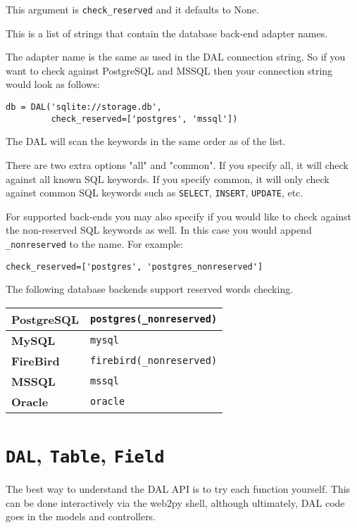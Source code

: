 \documentclass[justified,sixbynine,notoc]{tufte-book}
\def\ft{\small\tt}
\begin{document}
\begin{fullwidth}
This argument is {\ft check\_reserved} and it defaults to None.

This is a list of strings that contain the database back-end adapter names.

The adapter name is the same as used in the DAL connection string. So if you want to check against PostgreSQL and MSSQL then your connection string would look as follows:
\begin{lstlisting}
db = DAL('sqlite://storage.db',
         check_reserved=['postgres', 'mssql'])
\end{lstlisting}

The DAL will scan the keywords in the same order as of the list.

There are two extra options "all" and "common". If you specify all, it will check against all known SQL keywords. If you specify common, it will only check against common SQL keywords such as {\ft SELECT}, {\ft INSERT}, {\ft UPDATE}, etc.

For supported back-ends you may also specify if you would like to check against the non-reserved SQL keywords as well. In this case you would append {\ft \_nonreserved} to the name. For example:
\begin{lstlisting}
check_reserved=['postgres', 'postgres_nonreserved']
\end{lstlisting}

The following database backends support reserved words checking.

\goodbreak\begin{center}
{\begin{tabular}{ll}\hline
{\bf PostgreSQL} & {\ft postgres(\_nonreserved)}\\ \hline
{\bf MySQL} & {\ft mysql}\\
{\bf FireBird} & {\ft firebird(\_nonreserved)}\\
{\bf MSSQL} & {\ft mssql}\\
{\bf Oracle} & {\ft oracle} \\ \hline
\end{tabular}}
\end{center}
\goodbreak\section{{\ft DAL}, {\ft Table}, {\ft Field}}

The best way to understand the DAL API is to try each function yourself. This can be done interactively via the web2py shell, although ultimately, DAL code goes in the models and controllers.


\end{fullwidth}
\end{document}
